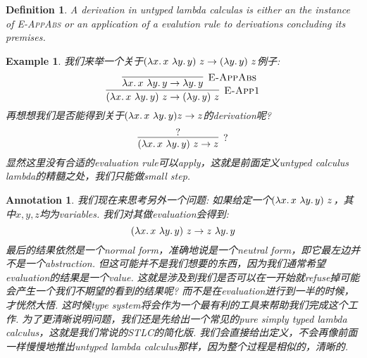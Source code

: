 \documentclass{article}
\newtheorem{example}[theorem]{Example}
\newtheorem{definition}[theorem]{Definition}
\newtheorem{annotation}[theorem]{Annotation}
\newcommand{\lam}[2]{\ensuremath{\lambda #1\ldotp #2}} %
\begin{document}
\begin{definition}
\rm A \emph{derivation} in untyped lambda calculas is either an the instance of \textsc{E-AppAbs} or an application of a evalution rule to derivations concluding its premises. 
\end{definition}

\begin{example}
\rm 我们来举一个关于$(\lam{x}{x}~\lam{y}{y})~z \to (\lam{y}{y})~z$例子:
\[
	\infer[\textsc{E-App1}]{(\lam{x}{x}~\lam{y}{y})~z \to (\lam{y}{y})~z}{\infer[\textsc{E-AppAbs}]{\lam{x}{x}~\lam{y}{y} \to \lam{y}{y}}{}}
\] 
再想想我们是否能得到关于$(\lam{x}{x}~\lam{y}{y}) z \to z$的derivation呢?
\[
	\infer[?]{(\lam{x}{x}~\lam{y}{y})~z \to z}{?}
\]
显然这里没有合适的evaluation rule可以apply，这就是前面定义untyped calculus lambda的精髓之处，我们只能做small step. 
\end{example}

\begin{annotation}
\rm 我们现在来思考另外一个问题: 如果给定一个$(\lam{x}{x~\lam{y}{y}})~z$，其中$x,y,z$均为variables. 我们对其做evaluation会得到:
\[
	(\lam{x}{x~\lam{y}{y}})~z \to z~\lam{y}{y} 
\]
最后的结果依然是一个normal form，准确地说是一个neutral form，即它最左边并不是一个abstraction. 但这可能并不是我们想要的东西，因为我们通常希望evaluation的结果是一个value. 这就是涉及到我们是否可以在一开始就refuse掉可能会产生一个我们不期望的看到的结果呢? 而不是在evaluation进行到一半的时候，才恍然大悟. 这时候type system将会作为一个最有利的工具来帮助我们完成这个工作. 为了更清晰说明问题，我们还是先给出一个常见的\emph{pure simply typed lambda calculus}，这就是我们常说的STLC的简化版. 我们会直接给出定义，不会再像前面一样慢慢地推出untyped lambda calculus那样，因为整个过程是相似的，清晰的.  
\end{annotation}
\end{document}
